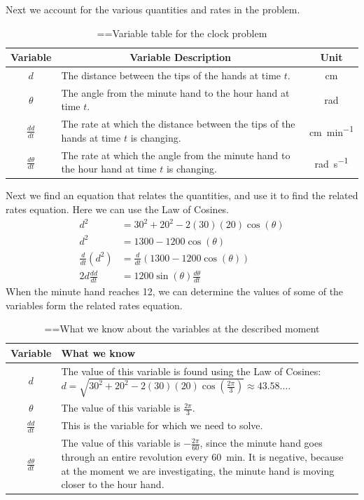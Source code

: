\documentclass[10pt,oneside,]{book}
\theoremstyle{plain}
\theoremstyle{definition}
\numberwithin{equation}{section}
\newcommand{\fe}[2]{#1\mathopen{}\left(#2\right)\mathclose{}}
\newcommand{\lz}[2]{\frac{d#1}{d#2}}
\newcommand{\lzoo}[2]{{\frac{d}{d#1}}{\left(#2\right)}}
\begin{document}
\par
Next we account for the various quantities and rates in the problem.%
\begin{table}
\centering
\caption{\binoppenalty=\maxdimen \relpenalty=\maxdimen Variable table for the clock problem\label{table-41}}
\begin{tabular}{cp{3.5in}c}
\toprule
Variable&\multicolumn{1}{c}{Variable Description}&Unit\\
\midrule
\(d\)&The distance between the tips of the hands at time \(t\).&\si{\centi\meter}\\
\midrule
\(\theta\)&The angle from the minute hand to the hour hand at time \(t\).&\si{\radian}\\
\midrule
\(\lz{d}{t}\)&The rate at which the distance between the tips of the hands at time \(t\) is changing.&\si{\centi\meter\per\minute}\\
\midrule
\(\lz{\theta}{t}\)&The rate at which the angle from the minute hand to the hour hand at time \(t\) is changing.&\si{\radian\per\second}\\
\bottomrule
\end{tabular}
\end{table}
\par
Next we find an equation that relates the quantities, and use it to find the related rates equation. Here we can use the Law of Cosines.\begin{align*}
d^2&=30^2+20^2-2(30)(20)\fe{\cos}{\theta}\\
d^2&=1300-1200\fe{\cos}{\theta}\\
\lzoo{t}{d^2}&=\lzoo{t}{1300-1200\fe{\cos}{\theta}}\\
2d\lz{d}{t}&=1200\fe{\sin}{\theta}\lz{\theta}{t}
\end{align*}When the minute hand reaches 12, we can determine the values of some of the variables form the related rates equation.%
\begin{table}
\centering
\caption{\binoppenalty=\maxdimen \relpenalty=\maxdimen What we know about the variables at the described moment\label{table-42}}
\begin{tabular}{cp{4in}}
\toprule
Variable&What we know\\
\midrule
\(d\)&The value of this variable is found using the Law of Cosines: \(d=\sqrt{30^2+20^2-2(30)(20)\fe{\cos}{\frac{2\pi}{3}}}\approx43.58\ldots\).\\
\midrule
\(\theta\)&The value of this variable is \(\frac{2\pi}{3}\).\\
\midrule
\(\lz{d}{t}\)&This is the variable for which we need to solve.\\
\midrule
\(\lz{\theta}{t}\)&The value of this variable is \(-\frac{2\pi}{60}\), since the minute hand goes through an entire revolution every \SI{60}{\minute}. It is negative, because at the moment we are investigating, the minute hand is moving closer to the hour hand.\\
\bottomrule
\end{tabular}
\end{table}
\end{document}
